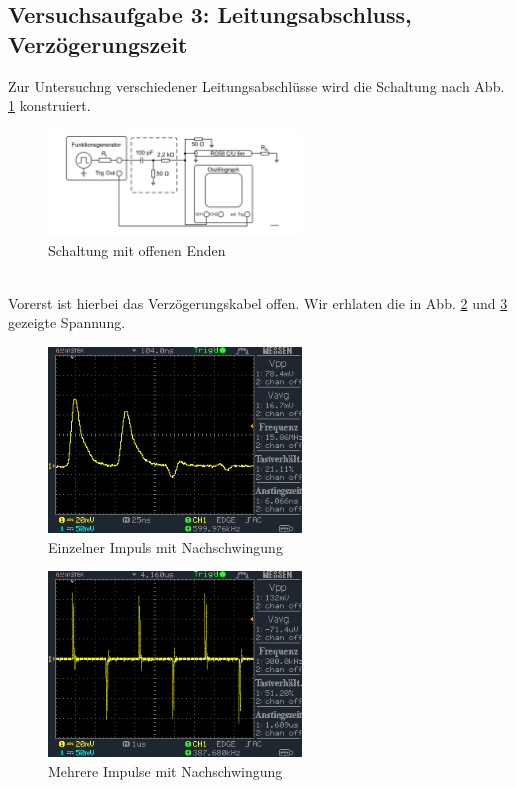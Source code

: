 \documentclass[a4paper,10pt]{article}
\numberwithin{equation}{section}
\begin{document}
\subsection{Versuchsaufgabe 3: Leitungsabschluss, Verzögerungszeit}
Zur Untersuchng verschiedener Leitungsabschlüsse wird die Schaltung nach Abb. \ref{fig:3.1} konstruiert. 
\begin{figure}[h]
        \centering
        \includegraphics[width=0.6\textwidth]{Schaltung_Abschluss.png}
        \caption{Schaltung mit offenen Enden}
		\label{fig:3.1}
\end{figure}\\
\indent Vorerst ist hierbei das Verzögerungskabel offen. Wir erhlaten die in Abb. \ref{fig:3.2} und \ref{fig:3.3} gezeigte Spannung.
\begin{figure}[h]
        \centering
        \includegraphics[width=0.6\textwidth]{data/DS0018.BMP.png}
        \caption{Einzelner Impuls mit Nachschwingung}
		\label{fig:3.2}
\end{figure}
\begin{figure}[h]
        \centering
        \includegraphics[width=0.6\textwidth]{data/DS0021.BMP.png}
        \caption{Mehrere Impulse mit Nachschwingung}
		\label{fig:3.3}
\end{figure}\\
\end{document}
